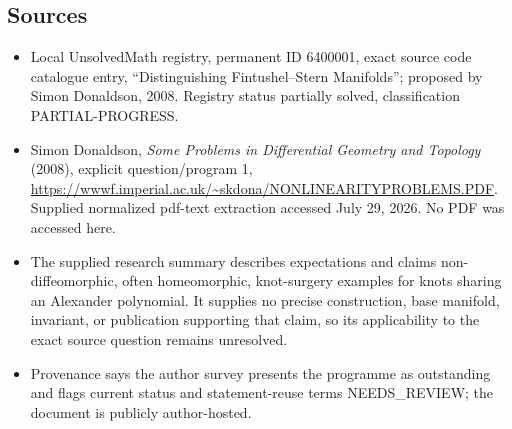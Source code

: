 \documentclass[11pt]{article}
\begin{document}
\subsection{Sources}
\begin{itemize}
\item Local UnsolvedMath registry, permanent ID 6400001, exact source code catalogue entry, ``Distinguishing Fintushel--Stern Manifolds''; proposed by Simon Donaldson, 2008. Registry status partially solved, classification PARTIAL-PROGRESS.
\item Simon Donaldson, \emph{Some Problems in Differential Geometry and Topology} (2008), explicit question/program 1, \url{https://wwwf.imperial.ac.uk/~skdona/NONLINEARITYPROBLEMS.PDF}. Supplied normalized pdf-text extraction accessed July 29, 2026. No PDF was accessed here.
\item The supplied research summary describes expectations and claims non-diffeomorphic, often homeomorphic, knot-surgery examples for knots sharing an Alexander polynomial. It supplies no precise construction, base manifold, invariant, or publication supporting that claim, so its applicability to the exact source question remains unresolved.
\item Provenance says the author survey presents the programme as outstanding and flags current status and statement-reuse terms NEEDS\_REVIEW; the document is publicly author-hosted.
\end{itemize}
\end{document}
